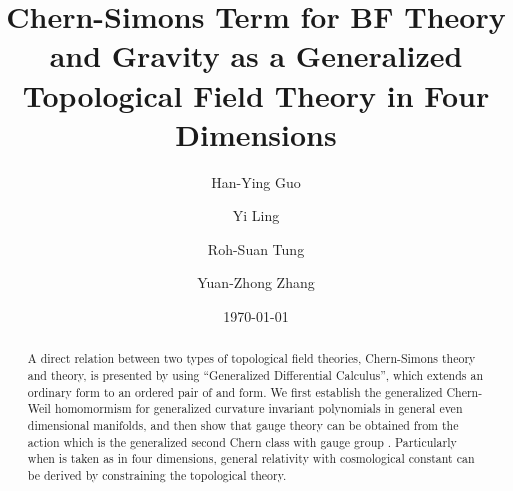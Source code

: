 \documentclass[a4paper,twocolumn,showpacs,prd]{revtex4}
\begin{document}

\title{Chern-Simons Term for BF Theory and
Gravity as a Generalized \\Topological Field Theory in Four
Dimensions}

\author{Han-Ying Guo\coordHE{}}

\author{Yi Ling\coordHE{}}

\author{Roh-Suan Tung\coordHE{}}

\author{Yuan-Zhong Zhang\coordHE{}}






\date{\today}

\begin{abstract}
\quad A direct relation between two types of topological field
theories, Chern-Simons theory and \coordHE{} theory, is presented by
using ``Generalized Differential Calculus'', which extends an
ordinary \coordHE{}form to an ordered pair of \coordHE{} and \coordHE{}form. We
first establish the generalized Chern-Weil homomormism for
generalized curvature invariant polynomials in general even
dimensional manifolds, and then show that \coordHE{} gauge theory can be
obtained from the action which is the generalized second Chern
class with gauge group \coordHE{}. Particularly when \coordHE{} is taken as
\coordHE{} in four dimensions, general relativity with cosmological
constant can be derived by constraining the topological \coordHE{}
theory.
\end{abstract}
\end{document}
